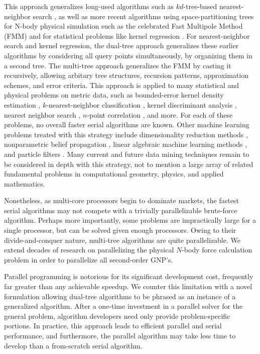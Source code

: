 \documentclass[twoside,leqno,twocolumn]{article}
\begin{document}
This approach generalizes long-used algorithms such as $kd$-tree-based nearest-neighbor search \cite{friedman_bentley_finkel}, as well as more recent algorithms using space-partitioning trees for N-body physical simulation such as the celebrated Fast Multipole Method (FMM) \cite{greengard_fmm} and for statistical problems like kernel regression \cite{moore97efficient}.
For nearest-neighbor search and kernel regression, the dual-tree approach generalizes these earlier algorithms by considering all query points simultaneously, by organizing them in a second tree.
The multi-tree approach generalizes the FMM by casting it recursively, allowing arbitary tree structures, recursion patterns, approximation schemes, and error criteria.
This approach is applied to many statistical and physical problems on metric data, such as bounded-error kernel density estimation \cite{gray_nbody, gray_kde, lee_gauss1, lee_gauss2},  $k$-nearest-neighbor classification \cite{ting-liu}, kernel discriminant analysis \cite{nbc-compstat}, nearest neighbor search \cite{gray_nbody}, $n$-point correlation \cite{gray_nbody, moore01fast}, and more.
For each of these problems, no overall faster serial algorithms are known.
Other machine learning problems treated with this strategy include dimensionality reduction methods \cite{hochreiter00beyond}, nonparametric belief propagation \cite{alex-ihler}, linear algebraic machine learning methods \cite{freitas_fast}, and particle filters \cite{klaas-toward}.
Many current and future data mining techniques remain to be considered in depth with this strategy, not to mention a large array of related fundamental problems in computational geometry, physics, and applied mathematics.

Nonetheless, as multi-core processors begin to dominate markets, the fastest serial algorithms may not compete with a trivially parallelizable brute-force algorithm.
Perhaps more importantly, some problems are impractically large for a single processor, but can be solved given enough processors.
Owing to their divide-and-conquer nature, multi-tree algorithms are quite parallelizable.
We extend decades of research on parallelizing the physical $N$-body force calculation problem in order to parallelize all second-order GNP's.

Parallel programming is notorious for its significant development cost, frequently far greater than any achievable speedup.
We counter this limitation with a novel formulation allowing dual-tree algorithms to be phrased as an instance of a generalized algorithm.
After a one-time investment in a parallel solver for the general problem, algorithm developers need only provide problem-specific portions.
In practice, this approach leads to efficient parallel and serial performance, and furthermore, the parallel algorithm may take less time to develop than a from-scratch serial algorithm.
\end{document}
